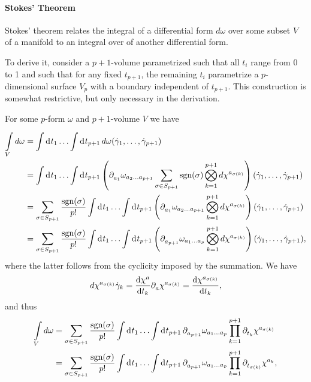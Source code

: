 \paragraph{Stokes' Theorem}
Stokes' theorem relates the integral of a differential form $d\omega$ over some subset $V$ of a manifold to an integral over  of another differential form.

To derive it, consider a $p + 1$-volume parametrized such that all $t_{i}$ range from 0 to 1 and such that for any fixed $t_{p + 1}$, the remaining $t_{i}$ parametrize a $p$-dimensional surface $V_{p}$ with a boundary independent of $t_{p + 1}$. This construction is somewhat restrictive, but only necessary in the derivation.

For some $p$-form $\omega$ and $p + 1$-volume $V$ we have
\begin{align*}
	\minteg{V}{d\omega} &= \integ{}{}{t_{1}}{\dots \integ{}{}{t_{p + 1}}{d\omega(\dot{\gamma}_{1},\dots, \dot{\gamma}_{p + 1})}} \\
	                    &= \integ{}{}{t_{1}}{\dots \integ{}{}{t_{p + 1}}{\left(\del{a_{1}}{\omega_{a_{2}\dots a_{p + 1}}}\sum\limits_{\sigma\in S_{p + 1}}\text{sgn}(\sigma)\bigotimes_{k = 1}^{p + 1}d\chi^{a_{\sigma(k)}}\right)(\dot{\gamma}_{1},\dots, \dot{\gamma}_{p + 1})}} \\
	                    &= \sum\limits_{\sigma\in S_{p + 1}}\frac{\text{sgn}(\sigma)}{p!}\integ{}{}{t_{1}}{\dots \integ{}{}{t_{p + 1}}{\left(\del{a_{1}}{\omega_{a_{2}\dots a_{p + 1}}}\bigotimes_{k = 1}^{p + 1}d\chi^{a_{\sigma(k)}}\right)(\dot{\gamma}_{1},\dots, \dot{\gamma}_{p + 1})}} \\
	                    &= \sum\limits_{\sigma\in S_{p + 1}}\frac{\text{sgn}(\sigma)}{p!}\integ{}{}{t_{1}}{\dots \integ{}{}{t_{p + 1}}{\left(\del{a_{p + 1}}{\omega_{a_{1}\dots a_{p}}}\bigotimes_{k = 1}^{p + 1}d\chi^{a_{\sigma(k)}}\right)(\dot{\gamma}_{1},\dots, \dot{\gamma}_{p + 1})}},
\end{align*}
where the latter follows from the cyclicity imposed by the summation. We have
\begin{align*}
	d\chi^{a_{\sigma(k)}}{\dot{\gamma}_{k}} = \dv{\chi^{a}}{t_{k}}\partial^{}_{a}\chi^{a_{\sigma(k)}} = \dv{\chi^{a_{\sigma(k)}}}{t_{k}},
\end{align*}
and thus
\begin{align*}
	\minteg{V}{d\omega} &= \sum\limits_{\sigma\in S_{p + 1}}\frac{\text{sgn}(\sigma)}{p!}\integ{}{}{t_{1}}{\dots \integ{}{}{t_{p + 1}}{\del{a_{p + 1}}{\omega_{a_{1}\dots a_{p}}}\prod\limits_{k = 1}^{p + 1}\del{t_{k}}{\chi^{a_{\sigma(k)}}}}} \\
	                    &= \sum\limits_{\sigma\in S_{p + 1}}\frac{\text{sgn}(\sigma)}{p!}\integ{}{}{t_{1}}{\dots \integ{}{}{t_{p + 1}}{\del{a_{p + 1}}{\omega_{a_{1}\dots a_{p}}}\prod\limits_{k = 1}^{p + 1}\del{t_{\sigma(k)}}{\chi^{a_{k}}}}},
\end{align*}
